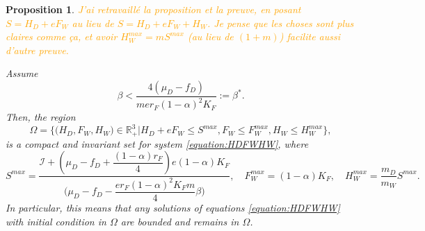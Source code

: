 \documentclass{article}
\newcommand{\cI}{\mathcal{I}}
\newcommand{\vdeux}[1]{\textcolor{orange}{#1}}
\newtheorem{prop}[theorem]{Proposition}
\theoremstyle{definition}
\theoremstyle{remark}
\begin{document}
\begin{prop}\label{prop:invariantRegion} 
\vdeux{J'ai retravaillé la proposition et la preuve, en posant $S = H_D + eF_W$ au lieu de $S = H_D + eF_W + H_W$. Je pense que les choses sont plus claires comme ça, et avoir $H_W^{max} = m S^{max}$ (au lieu de $(1 + m)$) facilite aussi d'autre preuve.}

Assume 
\begin{equation*}
\beta < \dfrac{4(\mu_D - f_D)}{m e r_F (1-\alpha)^2 K_F} := \beta^*.
\end{equation*}
Then, the region
$$\Omega = \Big\{\Big(H_D, F_W, H_W \Big) \in \mathbb{R}_+^3  \Big|H_D + eF_W \leq S^{max}, F_W \leq F_W^{max}, H_W \leq H_W^{max} \Big\},$$
is a compact and invariant set for system \eqref{equation:HDFWHW}, 
where
$$
S^{max} = \dfrac{\cI + \left( \mu_D - f_D   +  \dfrac{(1-\alpha)r_F}{4}\right)e(1-\alpha)K_F}{  \Big(\mu_D -f_D - \dfrac{er_F (1-\alpha)^2K_F m}{4} \beta\Big)} ,
\quad
F_W^{max} = (1-\alpha)K_F,
\quad
H_W^{max} = \dfrac{m_D}{m_W} S^{max}.
$$
In particular, this means that any solutions of equations \eqref{equation:HDFWHW} with initial condition in $\Omega$ are bounded and remains in $\Omega$.
\end{prop}
%
\end{document}
